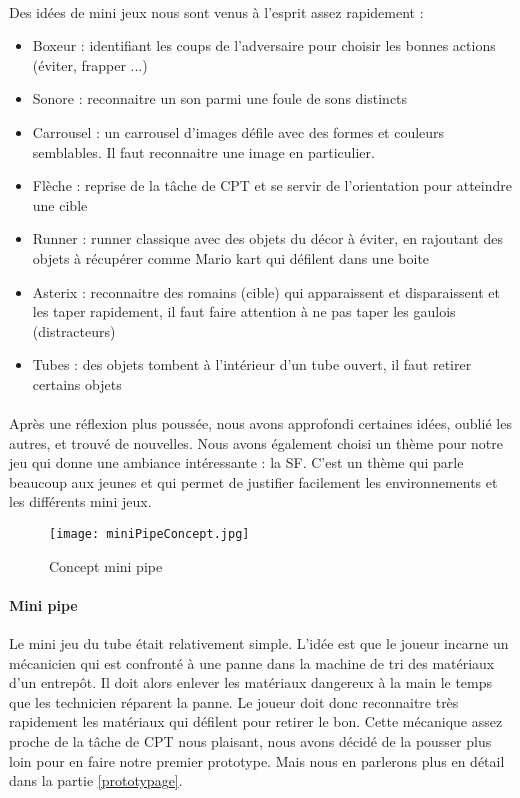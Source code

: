 \paragraph{}Des idées de mini jeux nous sont venus à l'esprit assez rapidement :
\begin{itemize}
\item Boxeur : identifiant les coups de l'adversaire pour choisir les bonnes actions (éviter, frapper ...)
\item Sonore : reconnaitre un son parmi une foule de sons distincts
\item Carrousel : un carrousel d'images défile avec des formes et couleurs semblables. Il faut reconnaitre une image en particulier.
\item Flèche : reprise de la tâche de CPT et se servir de l'orientation pour atteindre une cible
\item Runner : runner classique avec des objets du décor à éviter, en rajoutant des objets à récupérer comme Mario kart qui défilent dans une boite
\item Asterix : reconnaitre des romains (cible) qui apparaissent et disparaissent et les taper rapidement, il faut faire attention à ne pas taper les gaulois (distracteurs)
\item Tubes : des objets tombent à l'intérieur d'un tube ouvert, il faut retirer certains objets
\end{itemize}

\paragraph{}Après une réflexion plus poussée, nous avons approfondi certaines idées, oublié les autres, et trouvé de nouvelles. Nous avons également choisi un thème pour notre jeu qui
donne une ambiance intéressante : la \gls{SF}. C'est un thème qui parle beaucoup aux jeunes et qui permet de justifier facilement les environnements et les différents mini jeux.


\begin{wrapfigure}[11]{l}{6cm}
    \vspace{-25pt}
    \begin{center}
    \texttt{[image: miniPipeConcept.jpg]}
    \end{center}
    \captionsetup{labelformat=simpleNumber}
    \caption{Concept mini pipe}
\label{MiniPipeConcept}
\end{wrapfigure}

\paragraph{Mini pipe}Le mini jeu du tube était relativement simple. L'idée est que le joueur incarne un mécanicien qui est confronté à une panne dans la machine de tri des matériaux d'un
entrepôt. Il doit alors enlever les matériaux dangereux à la main le temps que les technicien réparent la panne. Le joueur doit donc reconnaitre très rapidement les matériaux qui
défilent pour retirer le bon. Cette mécanique assez proche de la tâche de CPT nous plaisant, nous avons décidé de la pousser plus loin pour en faire notre premier prototype. Mais nous
en parlerons plus en détail dans la partie \ref{prototypage}.

